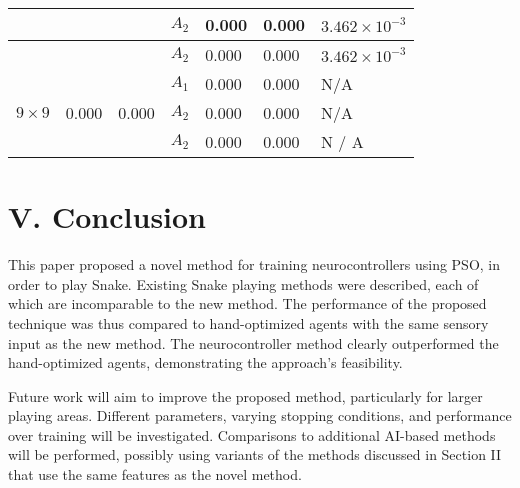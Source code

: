 \documentclass[10pt]{article}
\begin{document}
\begin{table}[h]
\begin{center}
\begin{tabular}{|l|l|l|l|l|l|l|}
\hline
 &  &  & $A_{2}$ & 0.000 & 0.000 & $3.462 \times 10^{-3}$ \\
\hline
 &  &  & $A_{2}$ & 0.000 & 0.000 & $3.462 \times 10^{-3}$ \\
\hline
\multirow{3}{*}{$9 \times 9$} & \multirow{3}{*}{0.000} & \multirow{3}{*}{0.000} & $A_{1}$ & 0.000 & 0.000 & N/A \\
\hline
 &  &  & $A_{2}$ & 0.000 & 0.000 & N/A \\
\hline
 &  &  & $A_{2}$ & 0.000 & 0.000 & N / A \\
\hline
\end{tabular}
\end{center}
\end{table}

\section*{V. Conclusion}
This paper proposed a novel method for training neurocontrollers using PSO, in order to play Snake. Existing Snake playing methods were described, each of which are incomparable to the new method. The performance of the proposed technique was thus compared to hand-optimized agents with the same sensory input as the new method. The neurocontroller method clearly outperformed the hand-optimized agents, demonstrating the approach's feasibility.

Future work will aim to improve the proposed method, particularly for larger playing areas. Different parameters, varying stopping conditions, and performance over training will be investigated. Comparisons to additional AI-based methods will be performed, possibly using variants of the methods discussed in Section II that use the same features as the novel method.
\end{document}
